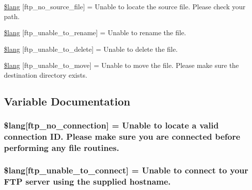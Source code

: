 \begin{DoxyCompactItemize}
\item 
\hyperlink{ftp__lang_8php_abf3e74ee1af13c9b0f0cc63fbb9081f1}{\$lang} \mbox{[}\textquotesingle{}ftp\+\_\+no\+\_\+source\+\_\+file\textquotesingle{}\mbox{]} = \textquotesingle{}Unable to locate the source file. Please check your path.\textquotesingle{}
\item 
\hyperlink{ftp__lang_8php_ae2715b036a8015f4da2841c15ab8db79}{\$lang} \mbox{[}\textquotesingle{}ftp\+\_\+unable\+\_\+to\+\_\+rename\textquotesingle{}\mbox{]} = \textquotesingle{}Unable to rename the file.\textquotesingle{}
\item 
\hyperlink{ftp__lang_8php_a922b1d7a3667e2cacb0873788e548dca}{\$lang} \mbox{[}\textquotesingle{}ftp\+\_\+unable\+\_\+to\+\_\+delete\textquotesingle{}\mbox{]} = \textquotesingle{}Unable to delete the file.\textquotesingle{}
\item 
\hyperlink{ftp__lang_8php_a72178091982e6697b12337601213fa76}{\$lang} \mbox{[}\textquotesingle{}ftp\+\_\+unable\+\_\+to\+\_\+move\textquotesingle{}\mbox{]} = \textquotesingle{}Unable to move the file. Please make sure the destination directory exists.\textquotesingle{}
\end{DoxyCompactItemize}


\subsection{Variable Documentation}
\hypertarget{ftp__lang_8php_a8630404f8e0c3750f8d997f35622b6eb}{}
\subsubsection[{\$lang}]{\setlength{\rightskip}{0pt plus 5cm}\$lang\mbox{[}\textquotesingle{}ftp\+\_\+no\+\_\+connection\textquotesingle{}\mbox{]} = \textquotesingle{}Unable to locate {\bf a} valid connection I\+D. Please make sure you are connected before performing any file routines.\textquotesingle{}}\label{ftp__lang_8php_a8630404f8e0c3750f8d997f35622b6eb}
\hypertarget{ftp__lang_8php_a57d51cf019dd2e380b84c6e31cda0cf5}{}
\subsubsection[{\$lang}]{\setlength{\rightskip}{0pt plus 5cm}\$lang\mbox{[}\textquotesingle{}ftp\+\_\+unable\+\_\+to\+\_\+connect\textquotesingle{}\mbox{]} = \textquotesingle{}Unable to connect to your F\+T\+P server using the supplied hostname.\textquotesingle{}}\label{ftp__lang_8php_a57d51cf019dd2e380b84c6e31cda0cf5}
\hypertarget{ftp__lang_8php_affe13cbf898e1802abb3cd9d9ce2db97}{}
